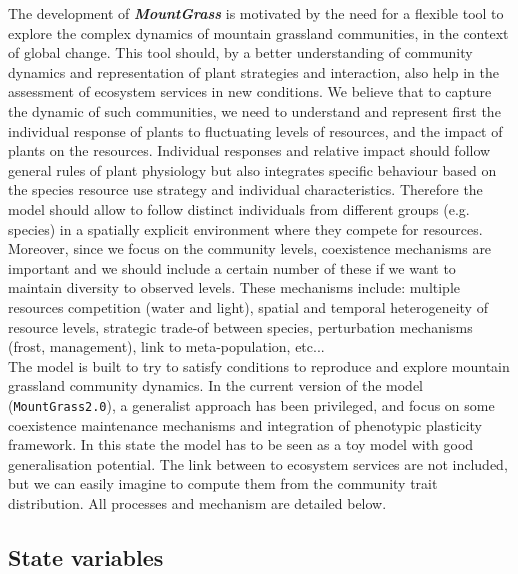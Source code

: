 \documentclass[a4paper,twoside, justified,marginals=raggedright, nobib]{tufte-handout}
\newcommand{\model}{\textit{\textbf{MountGrass }}}
\newcommand{\version}{\texttt{MountGrass2.0}}
\begin{document}
The development of \model is motivated by the need for a flexible tool to explore the complex dynamics of mountain grassland communities, in the context of global change. This tool should, by a better understanding of community dynamics and representation of plant strategies and interaction, also help in the assessment of ecosystem services in new conditions. We believe that to capture the dynamic of such communities, we need to understand and represent first the individual response of plants  to fluctuating levels of resources, and the impact of plants on the resources. Individual responses and relative impact should follow general rules of plant physiology but also integrates specific behaviour based on the species resource use strategy and individual characteristics. Therefore the model should allow to follow distinct individuals from different groups (e.g. species) in a spatially explicit environment where they compete for resources.\\
\indent Moreover, since we focus on the community levels, coexistence mechanisms are important and we should include a certain number of these if we want to maintain diversity to observed levels. These mechanisms include: multiple resources competition (water and light), spatial and temporal heterogeneity of resource levels, strategic trade-of between species, perturbation mechanisms (frost, management), link  to meta-population, etc...\\
\indent The model is built to try to satisfy conditions to reproduce and explore mountain grassland community dynamics. In the current version of the model (\version), a generalist approach has been privileged, and focus on some coexistence maintenance mechanisms and integration of phenotypic plasticity framework. In this state the model has to be seen as a toy model with good generalisation potential. The link between to ecosystem services are not included, but we can easily imagine to compute them from the community trait distribution. All processes and mechanism are detailed below.


\subsection{State variables}
\end{document}
